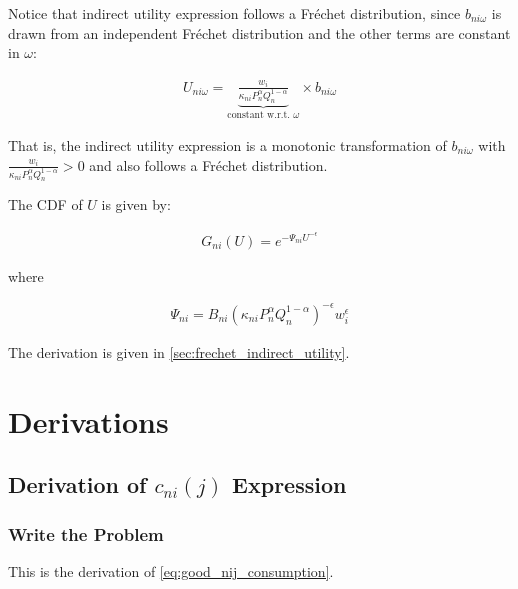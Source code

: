 \documentclass[10pt]{article}
\begin{document}
Notice that indirect utility expression follows a Fréchet distribution,
since $b_{n i \omega}$ is drawn from an independent Fréchet distribution
and the other terms are constant in $\omega$:

\begin{align}
    U_{n i \omega}=\underbrace{\frac{w_i}{\kappa_{n i} P_n^\alpha Q_n^{1-\alpha}}}_{\text {constant w.r.t. } \omega} \times b_{n i \omega}
\end{align}

That is, the indirect utility expression is a monotonic 
transformation of $b_{n i \omega}$ with $\frac{w_i}{\kappa_{n i} P_n^\alpha Q_n^{1-\alpha}} > 0$ and also 
follows a Fréchet distribution.

The CDF of $U$ is given by:

\begin{align}
    G_{n i}(U)=e^{-\Psi_{n i} U^{-\epsilon}} \label{eq:frechet_indirect_utility}
\end{align}

where 

\begin{align}
    \Psi_{n i}=B_{n i}\left(\kappa_{n i} P_n^\alpha Q_n^{1-\alpha}\right)^{-\epsilon} w_i^\epsilon
\end{align}

The derivation is given in \autoref{sec:frechet_indirect_utility}.

\section{Derivations}


\subsection{Derivation of $c_{n i}(j)$ Expression} 
\label{sec:good_nij_consumption}

\subsubsection{Write the Problem}
This is the derivation of \eqref{eq:good_nij_consumption}.
\end{document}

